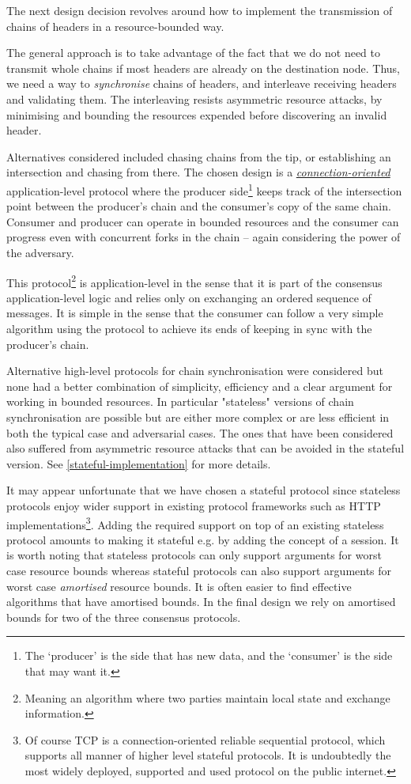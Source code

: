 \documentclass[11pt,a4paper]{article}
\begin{document}
The next design decision revolves around how to implement the
transmission of chains of headers in a resource-bounded way.

The general approach is to take advantage of the fact that we do not
need to transmit whole chains if most headers are already on the
destination node. Thus, we need a way to \emph{synchronise} chains of
headers, and interleave receiving headers and validating them. The
interleaving resists asymmetric resource attacks, by minimising and
bounding the resources expended before discovering an invalid header.

Alternatives considered included chasing chains from the tip, or
establishing an intersection and chasing from there. The chosen design
is a
\emph{\href{https://en.wikipedia.org/wiki/Connection-oriented_communication}{{connection-oriented}}}
application-level protocol where the producer side\footnote{The
  `producer' is the side that has new data, and the `consumer' is the
  side that may want it.} keeps track of the intersection point between
the producer's chain and the consumer's copy of the same chain. Consumer
and producer can operate in bounded resources and the consumer can
progress even with concurrent forks in the chain -- again considering
the power of the adversary.

This protocol\footnote{Meaning an algorithm where two parties maintain
  local state and exchange information.} is application-level in the
sense that it is part of the consensus application-level logic and
relies only on exchanging an ordered sequence of messages. It is simple
in the sense that the consumer can follow a very simple algorithm using
the protocol to achieve its ends of keeping in sync with the producer's
chain.

Alternative high-level protocols for chain synchronisation were
considered but none had a better combination of simplicity, efficiency
and a clear argument for working in bounded resources. In particular
"stateless" versions of chain synchronisation are possible but are
either more complex or are less efficient in both the typical case and
adversarial cases. The ones that have been considered also suffered from
asymmetric resource attacks that can be avoided in the stateful version.
See \cref{stateful-implementation} for more
details.

It may appear unfortunate that we have chosen a stateful protocol since
stateless protocols enjoy wider support in existing protocol frameworks
such as HTTP implementations\footnote{Of course TCP is a
  connection-oriented reliable sequential protocol, which supports all
  manner of higher level stateful protocols. It is undoubtedly the most
  widely deployed, supported and used protocol on the public internet.}.
Adding the required support on top of an existing stateless protocol
amounts to making it stateful e.g. by adding the concept of a session.
It is worth noting that stateless protocols can only support arguments
for worst case resource bounds whereas stateful protocols can also
support arguments for worst case \emph{amortised} resource bounds. It is
often easier to find effective algorithms that have amortised bounds. In
the final design we rely on amortised bounds for two of the three
consensus protocols.
\end{document}

